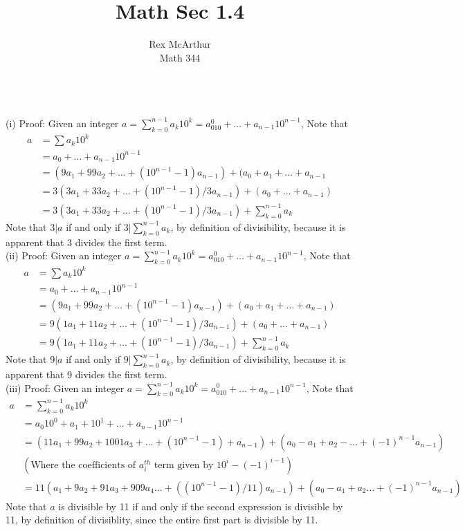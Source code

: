 \documentclass[letterpaper,12pt]{article}
\title{Math Sec 1.4}
\author{Rex McArthur\\Math 344}
\theoremstyle{definition}
\begin{document}
\maketitle
{}\\
(i)
Proof: Given an integer $a = \sum^{n-1}_{k=0} a_k10^k = a_010^0+\dots+
    a_{n-1}10^{n-1}$, Note that\\
        \begin{align*}
            a &= \sum{a_k10^k}\\
            & = a_0+\dots+a_{n-1}10^{n-1}\\
            & = (9a_1 + 99a_2 + \dots +(10^{n-1}-1)a_{n-1}) + (a_0 + a_1 + \dots
                + a_{n-1}\\
            & = 3(3a_1 + 33 a_2 + \dots +  (10^{n-1} -1)/3 a_{n-1}) + 
            (a_0+\dots+a_{n-1})\\
            & = 3(3a_1 + 33 a_2 + \dots +  (10^{n-1} -1)/3 a_{n-1}) + 
            \sum^{n-1}_{k=0} a_k
        \end{align*}
    Note that $3|a$ if and only if $3|\sum^{n-1}_{k=0} a_k$, by definition of 
    divisibility, because it is apparent that 3 divides the first term.\\
(ii)
Proof: Given an integer $a = \sum^{n-1}_{k=0} a_k10^k = a_010^0+\dots+
    a_{n-1}10^{n-1}$, Note that\\
        \begin{align*}
            a &= \sum{a_k10^k}\\
            & = a_0+\dots+a_{n-1}10^{n-1}\\
            & = (9a_1 + 99a_2 + \dots +(10^{n-1}-1)a_{n-1}) + (a_0 + a_1 + \dots
                + a_{n-1})\\
            & = 9(1a_1 + 11 a_2 + \dots +  (10^{n-1} -1)/3 a_{n-1}) + 
            (a_0+\dots+a_{n-1})\\
            & = 9(1a_1 + 11 a_2 + \dots +  (10^{n-1} -1)/3 a_{n-1}) + 
            \sum^{n-1}_{k=0} a_k
        \end{align*}
    Note that $9|a$ if and only if $9|\sum^{n-1}_{k=0} a_k$, by definition of 
    divisibility, because it is apparent that 9 divides the first term.\\
(iii)
Proof: Given an integer $a = \sum^{n-1}_{k=0} a_k10^k = a_010^0+\dots+
    a_{n-1}10^{n-1}$, Note that\\
\begin{align*}
    a &= \sum^{n-1}_{k = 0} a_k 10^k \\
    & = a_0 10^0 + a_1 + 10^1 + \dots + a_{n-1} 10^{n-1}\\
    & = (11a_1 + 99a_2 + 1001a_3 + \dots + (10^{n-1}-1)+a_{n-1}) + (a_0 - a_1 + 
        a_2 - \dots + (-1)^{n-1} a_{n-1})\\
   &(\text{Where the coefficients of $a_i^{th}$ term given by $10^{i}-(-1)^{i-1}$})\\
   & = 11(a_1 + 9a_2+91a_3+909a_4\dots+( (10^{n-1}-1)/11)a_{n-1})+(a_0-a_1+a_2\dots
        +(-1)^{n-1}a_{n-1})
\end{align*}
Note that $a$ is divisible by 11 if and only if the second expression is divisible
by 11, by definition of divisiblity, since the entire first part is divisible by 11.

\\
\end{document}
